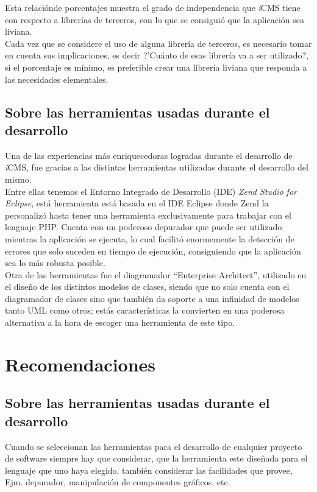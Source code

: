 Esta relaci\'onde porcentajes muestra el grado de independencia que \textit{i}CMS tiene con respecto a librer\'ias de terceros, con lo que se consigui\'o que la aplicaci\'on sea liviana.\\

Cada vez que se considere el uso de alguna librer\'ia de terceros, es necesario tomar en cuenta sus implicaciones, es decir ?'Cu\'anto de esas librer\'ia va a ser utilizado?, si el porcentaje es m\'inimo, es preferible crear una librer\'ia liviana que responda a las necesidades elementales.\\

\subsection{Sobre las herramientas usadas durante el desarrollo}
Una de las experiencias m\'as enriquecedoras logradas durante el desarrollo de \textit{i}CMS, fue gracias a las distintas herramientas utilizadas durante el desarrollo del mismo.\\

Entre ellas tenemos el Entorno Integrado de Desarrollo (IDE) \emph{Zend Studio for Eclipse}, est\'a herramienta est\'a basada en el IDE Eclipse donde Zend la personaliz\'o hasta tener una herramienta exclusivamente para trabajar con el lenguaje PHP. Cuenta con un poderoso depurador que puede ser utilizado mientras la aplicaci\'on se ejecuta, lo cual facilit\'o enormemente la detecci\'on de errores que solo suceden en tiempo de ejecuci\'on, consiguiendo que la aplicaci\'on sea lo m\'as robusta posible.\\

Otra de las herramientas fue el diagramador ``Enterprise Architect'', utilizado en el dise\~no de los distintos modelos de clases, siendo que no solo cuenta con el diagramador de clases sino que tambi\'en da soporte a una infinidad de modelos tanto UML como otros; est\'as caracter\'isticas la convierten en una poderosa alternativa a la hora de escoger una herramienta de este tipo.\\

\section{Recomendaciones}

\subsection{Sobre las herramientas usadas durante el desarrollo}
Cuando se seleccionan las herramientas para el desarrollo de cualquier proyecto de software siempre hay que considerar, que la herramienta este dise\~nada para el lenguaje que uno haya elegido, tambi\'en considerar las facilidades que provee, Ejm. depurador, manipulaci\'on de componentes gr\'aficos, etc.

